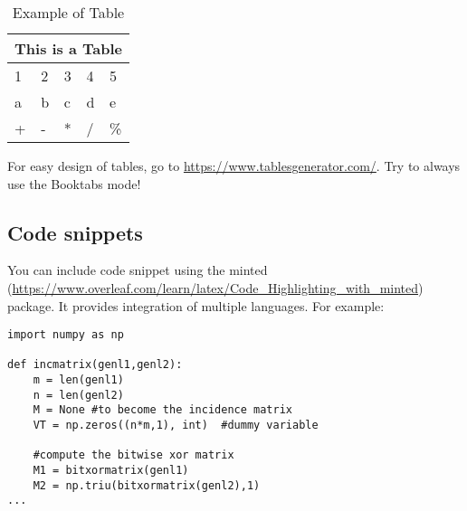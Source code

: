 \begin{table}[H]
    \centering
    \begin{tabular}{@{}lllll@{}}
    \toprule
    \multicolumn{5}{c}{This is a Table} \\ \midrule
    1     & 2     & 3    & 4    & 5     \\
    a     & b     & c    & d    & e     \\
    +     & -     & *    & /    & \%    \\ \bottomrule
    \end{tabular}
    \caption{Example of Table}
    \label{tab:table_example}
\end{table}

For easy design of tables, go to \url{https://www.tablesgenerator.com/}. Try to always use the Booktabs mode!

\subsection{Code snippets}
\label{subsec:code}

You can include code snippet using the minted (\url{https://www.overleaf.com/learn/latex/Code_Highlighting_with_minted}) package. It provides integration of multiple languages. For example:

\begin{verbatim}
import numpy as np
 
def incmatrix(genl1,genl2):
    m = len(genl1)
    n = len(genl2)
    M = None #to become the incidence matrix
    VT = np.zeros((n*m,1), int)  #dummy variable
 
    #compute the bitwise xor matrix
    M1 = bitxormatrix(genl1)
    M2 = np.triu(bitxormatrix(genl2),1) 
...
\end{verbatim}
